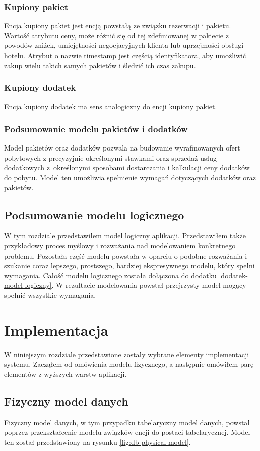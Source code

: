 \documentclass[a4paper,onecolumn,oneside,11pt,wide,floatssmall]{mwrep}
\theoremstyle{definition}
\theoremstyle{plain}%
\theoremstyle{remark}
\begin{document}
\subsection{Kupiony pakiet}
Encja kupiony pakiet jest encją powstałą ze związku rezerwacji i pakietu. Wartość atrybutu ceny, może różnić się od tej zdefiniowanej w pakiecie z powodów zniżek, umiejętności negocjacyjnych klienta lub uprzejmości obsługi hotelu. Atrybut o nazwie timestamp jest częścią identyfikatora, aby umożliwić zakup wielu takich samych pakietów i śledzić ich czas zakupu.

\subsection{Kupiony dodatek}
Encja kupiony dodatek ma sens analogiczny do encji kupiony pakiet.

\subsection{Podsumowanie modelu pakietów i dodatków}
Model pakietów oraz dodatków pozwala na budowanie wyrafinowanych ofert pobytowych z precyzyjnie określonymi stawkami oraz sprzedaż usług dodatkowych \mbox{z określonymi} sposobami dostarczania i kalkulacji ceny dodatków do pobytu. Model ten umożliwia spełnienie wymagań dotyczących dodatków oraz pakietów.

\section{Podsumowanie modelu logicznego}
W tym rozdziale przedstawiłem model logiczny aplikacji. Przedstawiłem także przykładowy proces myślowy i rozważania nad modelowaniem konkretnego problemu. Pozostała część modelu powstała w oparciu o podobne rozważania i szukanie coraz lepszego, prostszego, bardziej ekspresywnego modelu, który spełni wymagania. Całość modelu logicznego została dołączona do dodatku \ref{dodatek-model-logiczny}. W rezultacie modelowania powstał przejrzysty model mogący spełnić wszystkie wymagania.

\chapter{Implementacja}
W niniejszym rozdziale przedstawione zostały wybrane elementy implementacji systemu. Zacząłem od omówienia modelu fizycznego, a następnie omówiłem parę elementów z wyższych warstw aplikacji. 

\section{Fizyczny model danych}
Fizyczny model danych, w tym przypadku tabelaryczny model danych, powstał poprzez przekształcenie modelu związków encji do postaci tabelarycznej. Model ten został przedstawiony na rysunku \ref{fig:db-physical-model}.
\end{document}
